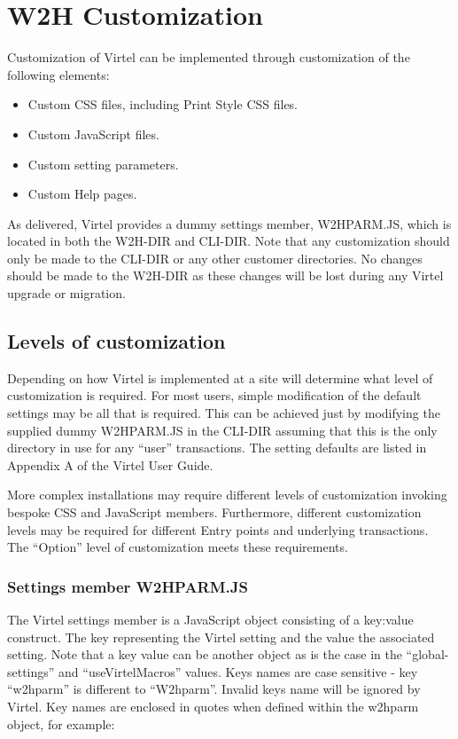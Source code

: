 \documentclass[letterpaper,10pt,english]{sphinxmanual}
\begin{document}
\chapter{W2H Customization}
\label{\detokenize{Customization:w2h-customization}}
Customization of Virtel can be implemented through customization of the following elements:
\begin{itemize}
\item {} 
Custom CSS files, including Print Style CSS files.

\item {} 
Custom JavaScript files.

\item {} 
Custom setting parameters.

\item {} 
Custom Help pages.

\end{itemize}

As delivered, Virtel provides a dummy settings member, W2HPARM.JS, which is located in both the W2H-DIR and CLI-DIR. Note that any customization should only be made to the CLI-DIR or any other customer directories. No changes should be made to the W2H-DIR as these changes will be lost during any Virtel upgrade or migration.


\section{Levels of customization}
\label{\detokenize{Customization:levels-of-customization}}
Depending on how Virtel is implemented at a site will determine what level of customization is required. For most users, simple modification of the default settings may be all that is required. This can be achieved just by modifying the supplied dummy W2HPARM.JS in the CLI-DIR assuming that this is the only directory in use for any “user” transactions. The setting defaults are listed in Appendix A of the Virtel User Guide.

More complex installations may require different levels of customization invoking bespoke CSS and JavaScript members. Furthermore, different customization levels may be required for different Entry points and underlying transactions. The “Option” level of customization meets these requirements.

\ignorespaces 

\subsection{Settings member W2HPARM.JS}
\label{\detokenize{Customization:settings-member-w2hparm-js}}\label{\detokenize{Customization:index-0}}
The Virtel settings member is a JavaScript object consisting of a key:value construct. The key representing the Virtel setting and the value the associated setting. Note that a key value can be another object as is the case in the “global-settings” and “useVirtelMacros” values. Keys names are case sensitive - key “w2hparm” is different to “W2hparm”. Invalid keys name will be ignored by Virtel. Key names are enclosed in quotes when defined within the w2hparm object, for example:
\end{document}
